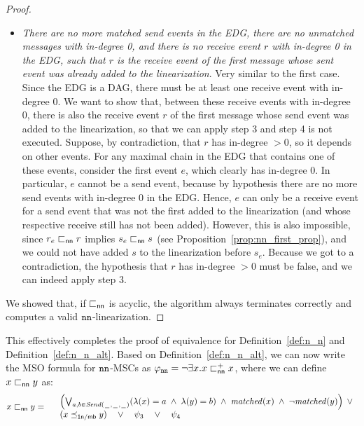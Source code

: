 \begin{proof}
\begin{itemize}
		\item \emph{There are no more matched send events in the EDG, there are no unmatched messages with in-degree 0, and there is no receive event $r$ with in-degree 0 in the EDG, such that $r$ is the receive event of the first message whose sent event was already added to the linearization}. Very similar to the first case. Since the EDG is a DAG, there must be at least one receive event with in-degree 0. We want to show that, between these receive events with in-degree 0, there is also the receive event $r$ of the first message whose send event was added to the linearization, so that we can apply step 3 and step 4 is not executed. Suppose, by contradiction, that $r$ has in-degree $>0$, so it depends on other events. For any maximal chain in the EDG that contains one of these events, consider the first event $e$, which clearly has in-degree 0. In particular, $e$ cannot be a send event, because by hypothesis there are no more send events with in-degree 0 in the EDG. Hence, $e$ can only be a receive event for a send event that was not the first added to the linearization (and whose respective receive still has not been added). However, this is also impossible, since $r_e \sqsubset_{\mathsf{nn}} r$ implies $s_e \sqsubset_{\mathsf{nn}} s$ (see Proposition~\ref{prop:nn_first_prop}), and we could not have added $s$ to the linearization before $s_e$. Because we got to a contradiction, the hypothesis that $r$ has in-degree $>0$ must be false, and we can indeed apply step 3.
	\end{itemize}
	We showed that, if $\sqsubset_{\mathsf{nn}}$ is acyclic, the algorithm always terminates correctly and computes a valid $\mathtt{nn}$-linearization.
\end{proof}

This effectively completes the proof of equivalence for Definition~\ref{def:n_n} and Definition~\ref{def:n_n_alt}. Based on Definition~\ref{def:n_n_alt}, we can now write the MSO formula for $\mathtt{nn}$-MSCs as 
$
	\varphi_{\mathtt{nn}} = \neg \exists x. x \sqsubset_{\mathsf{nn}}^{+} x 
$, 
where we can define $x \sqsubset_{\mathsf{nn}} y$ as:
\[
	x \sqsubset_{\mathsf{nn}} y =
	\begin{array}{rl}
	& \left(
		\bigvee_{\substack{a,b \in {\mathit{Send}(\hspace{0.1em}\underline{\hspace{0.5em}}\hspace{0.1em},\hspace{0.1em}\underline{\hspace{0.5em}}\hspace{0.1em},\hspace{0.1em}\underline{\hspace{0.5em}}\hspace{0.1em})}}}
		(\lambda(x) = a \;\wedge\; \lambda(y) = b)
		\;\wedge\; \mathit{matched}(x) \;\wedge\; \neg \mathit{matched}(y)
	\right) \;\vee\\
	& (x \preceq_{\mathsf{1n/\mathsf{mb}}} y) \quad \vee \quad \psi_3 \quad \vee \quad \psi_4\\
	\end{array}
\]

